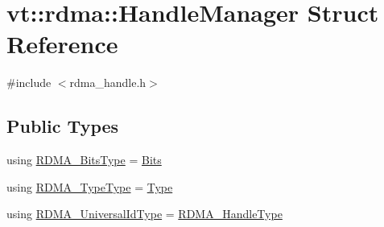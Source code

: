 \hypertarget{structvt_1_1rdma_1_1_handle_manager}{}\section{vt\+:\+:rdma\+:\+:Handle\+Manager Struct Reference}
\label{structvt_1_1rdma_1_1_handle_manager}


{\ttfamily \#include $<$rdma\+\_\+handle.\+h$>$}

\subsection*{Public Types}
\begin{DoxyCompactItemize}
\item 
using \hyperlink{structvt_1_1rdma_1_1_handle_manager_a7645bd240d1f95084087f2b01c0d343f}{R\+D\+M\+A\+\_\+\+Bits\+Type} = \hyperlink{namespacevt_1_1rdma_a91e7211515508952960ca446ea609f65}{Bits}
\item 
using \hyperlink{structvt_1_1rdma_1_1_handle_manager_ae80c26da7c940c50ddfc3625d4faad74}{R\+D\+M\+A\+\_\+\+Type\+Type} = \hyperlink{namespacevt_1_1rdma_ac848e1d9da43db6294bd06f83e5d3946}{Type}
\item 
using \hyperlink{structvt_1_1rdma_1_1_handle_manager_acebfe9aa5887a015cc5da18f4f7e55ae}{R\+D\+M\+A\+\_\+\+Universal\+Id\+Type} = \hyperlink{namespacevt_a10442579ec4e7ebef223818e64bcf908}{R\+D\+M\+A\+\_\+\+Handle\+Type}
\end{DoxyCompactItemize}
